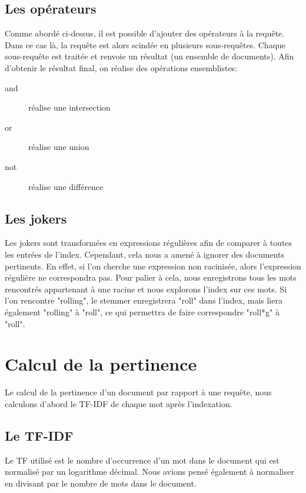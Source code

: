 \documentclass[a4paper,10pt]{article}
\begin{document}
\subsection{Les op\'erateurs}

Comme abord\'e ci-dessus, il est possible d'ajouter des op\'erateurs \`a la requ\^ete. Dans ce cas l\`a, la requ\^ete est alors scind\'ee en plusieurs sous-requ\^etes. Chaque sous-requ\^ete est trait\'ee et renvoie un r\'esultat (un ensemble de documents). Afin d'obtenir le r\'esultat final, on r\'ealise des op\'erations ensemblistes:

\begin{description}
 \item[and] r\'ealise une intersection
 \item[or] r\'ealise une union
 \item[not] r\'ealise une diff\'erence
\end{description}

\subsection{Les jokers}

Les jokers sont transform\'ees en expressions r\'eguli\`eres afin de comparer \`a toutes les entr\'ees de l'index. Cependant, cela nous a amen\'e \`a ignorer des documents pertinents. En effet, si l'on cherche une expression non racinis\'ee, alors l'expression r\'eguli\`ere ne correspondra pas. Pour palier \`a cela, nous enregistrons tous les mots rencontr\'es appartenant \`a une racine et nous explorons l'index sur ces mots. Si l'on rencontre "rolling", le stemmer enregistrera "roll" dans l'index, mais liera \'egalement "rolling" \`a "roll", ce qui permettra de faire correspondre "roll*g" \`a "roll". 

\section{Calcul de la pertinence}

Le calcul de la pertinence d'un document par rapport \`a une requ\^ete, nous calculons d'abord le TF-IDF de chaque mot apr\`es l'indexation.

\subsection{Le TF-IDF}

Le TF utilis\'e est le nombre d'occurrence d'un mot dans le document qui est normalis\'e par un logarithme d\'ecimal. Nous avions pens\'e \'egalement \`a normaliser en divisant par le nombre de mots dans le document.
\end{document}
